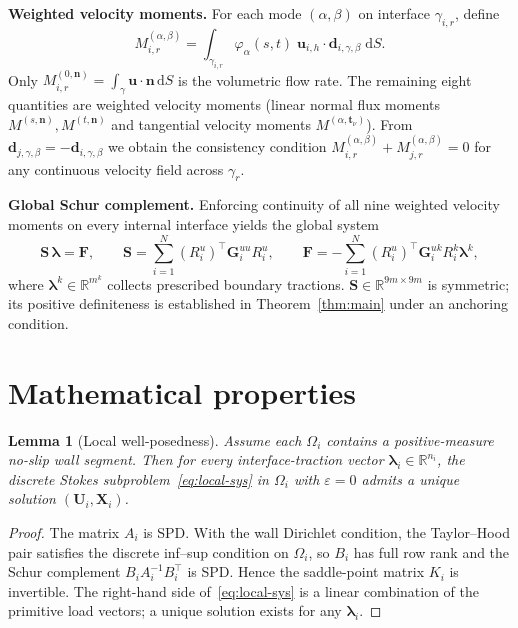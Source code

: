 \documentclass[11pt,a4paper]{article}
\newtheorem{lemma}{Lemma}[section]
\newcommand{\R}{\mathbb{R}}
\newcommand{\pore}[1]{\Omega_{#1}}
\newcommand{\iface}{\gamma}
\newcommand{\vel}{\bm{u}}
\newcommand{\normal}{\bm{n}}
\newcommand{\trac}{\bm{\lambda}}
\newcommand{\DtN}{\mathbf{G}}
\newcommand{\Schur}{\mathbf{S}}
\newcommand{\respvel}{\mathbf{U}}
\newcommand{\resppres}{\mathbf{X}}
\begin{document}
\medskip\noindent
\textbf{Weighted velocity moments.}
For each mode $(\alpha,\beta)$ on interface $\iface_{i,r}$, define
\begin{equation}\label{eq:moment}
  M_{i,r}^{(\alpha,\beta)}
  = \int_{\iface_{i,r}} \varphi_\alpha(s,t)\;
    \vel_{i,h} \cdot \bm{d}_{i,\gamma,\beta} \;\mathrm{d}S.
\end{equation}
Only $M_{i,r}^{(0,\normal)} = \int_\iface \vel\cdot\normal\,\mathrm{d}S$
is the volumetric flow rate.  The remaining eight quantities are weighted
velocity moments (linear normal flux moments $M^{(s,\normal)},M^{(t,\normal)}$
and tangential velocity moments $M^{(\alpha,\bm{t}_\nu)}$).
From $\bm{d}_{j,\gamma,\beta} = -\bm{d}_{i,\gamma,\beta}$ we obtain the
consistency condition
$M_{i,r}^{(\alpha,\beta)} + M_{j,r}^{(\alpha,\beta)} = 0$ for any
continuous velocity field across $\iface_r$.

\medskip\noindent
\textbf{Global Schur complement.}
Enforcing continuity of all nine weighted velocity moments on every internal
interface yields the global system
\begin{equation}\label{eq:schur}
  \Schur\,\trac = \bm{F},\qquad
  \Schur = \sum_{i=1}^N (R_i^u)^\top \DtN_i^{uu} R_i^u,\qquad
  \bm{F} = -\sum_{i=1}^N (R_i^u)^\top \DtN_i^{uk} R_i^k \trac^k,
\end{equation}
where $\trac^k \in \R^{m^k}$ collects prescribed boundary tractions.
$\Schur \in \R^{9m \times 9m}$ is symmetric; its positive definiteness
is established in Theorem~\ref{thm:main} under an anchoring condition.

\section{Mathematical properties}

\begin{lemma}[Local well-posedness]\label{lem:wellposed}
  Assume each $\pore{i}$ contains a positive-measure no-slip wall segment.
  Then for every interface-traction vector $\trac_i \in \R^{n_i}$, the
  discrete Stokes subproblem~\eqref{eq:local-sys} in $\pore{i}$ with
  $\varepsilon = 0$ admits a unique solution
  $(\respvel_i, \resppres_i)$.
\end{lemma}

\begin{proof}
  The matrix $A_i$ is SPD.  With the wall Dirichlet condition, the
  Taylor--Hood pair satisfies the discrete inf--sup condition on
  $\pore{i}$, so $B_i$ has full row rank and the Schur complement
  $B_i A_i^{-1} B_i^\top$ is SPD.  Hence the saddle-point matrix
  $K_i$ is invertible.  The right-hand side of~\eqref{eq:local-sys}
  is a linear combination of the primitive load vectors; a unique
  solution exists for any $\trac_i$.
\end{proof}
\end{document}
